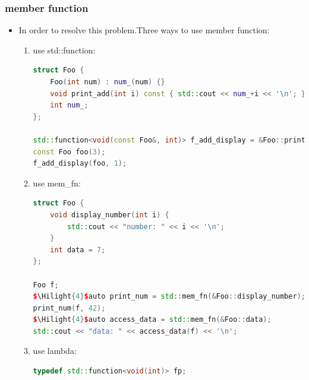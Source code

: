 \documentclass[a4paper,11pt,twoside]{book}
\newcommand{\Hilight}[1]{\makebox[0pt][l]{\color{yellow}\rule[-3pt]{#1em}{11pt}}}
\newcommand{\Hilight}[1]{}
\begin{document}
\subsubsection{member function}
\begin{itemize}
	If you called for\_each() with \texttt{\&Item::Foo}, the code try to call \texttt{(\&Item::Foo)(x)}, which is ill-formed since for pointers to members you have to write \texttt{(x.*\&Item::Foo)()}. It's that syntactical difference that mem\_fn is meant to solve: mem\_fn deals with the invocation syntax of pointers to members so that you can use all the algorithms with pointers to members as well as functions and function objects. You cannot have \texttt{for\_each(v.begin(), v.end(), \&Item::Foo)} but you can have \texttt{for\_each(v.begin(), v.end(), mem\_fn(\&Item::Foo))}.
\begin{lstlisting}
template<class InputIt, class UnaryFunction>
UnaryFunction for_each(InputIt first, InputIt last, UnaryFunction f){
	for (; first != last; ++first) {
		$\Hilight{20}$f(*first); // <== N.B. f(*first)
	}
}
\end{lstlisting}
	\item In order to resolve this problem.Three ways to use member function:
	\begin{enumerate}
		\item use std::function:
\begin{lstlisting}[frame=single, language=c++]
struct Foo {
	Foo(int num) : num_(num) {}
	void print_add(int i) const { std::cout << num_+i << '\n'; }
	int num_;
};

std::function<void(const Foo&, int)> f_add_display = &Foo::print_add;
const Foo foo(3);
f_add_display(foo, 1); 
\end{lstlisting}

	\item use mem\_fn:
\begin{lstlisting}[frame=single, language=c++]
struct Foo {
	void display_number(int i) {
		std::cout << "number: " << i << '\n';
	}
	int data = 7;
};

Foo f;
$\Hilight{4}$auto print_num = std::mem_fn(&Foo::display_number);
print_num(f, 42);
$\Hilight{4}$auto access_data = std::mem_fn(&Foo::data);
std::cout << "data: " << access_data(f) << '\n';
\end{lstlisting}

	\item use lambda:
\begin{lstlisting}[frame=single, language=c++]
typedef std::function<void(int)> fp;


\end{lstlisting}
\end{enumerate}
\end{itemize}
\end{document}
